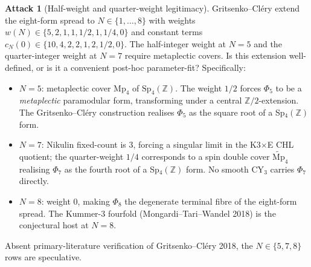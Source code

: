 \documentclass[11pt]{article}
\theoremstyle{definition}
\newtheorem{attack}[theorem]{Attack}
\begin{document}
\begin{attack}[Half-weight and quarter-weight legitimacy]
Gritsenko--Cl\'ery extend the eight-form spread to $N \in \{1, \ldots, 8\}$
with weights $w(N) \in \{5, 2, 1, 1, 1/2, 1, 1/4, 0\}$ and constant terms
$c_N(0) \in \{10, 4, 2, 2, 1, 2, 1/2, 0\}$. The half-integer weight at
$N = 5$ and the quarter-integer weight at $N = 7$ require metaplectic
covers. Is this extension well-defined, or is it a convenient
post-hoc parameter-fit? Specifically:
\begin{itemize}
\item $N = 5$: metaplectic cover $\mathrm{Mp}_4$ of $\mathrm{Sp}_4(\mathbb{Z})$.
The weight $1/2$ forces $\Phi_5$ to be a \emph{metaplectic} paramodular
form, transforming under a central $\mathbb{Z}/2$-extension. The
Gritsenko--Cl\'ery construction realises $\Phi_5$ as the square root
of a Sp$_4(\mathbb{Z})$ form.
\item $N = 7$: Nikulin fixed-count is $3$, forcing a singular limit in
the K3$\times$E CHL quotient; the quarter-weight $1/4$ corresponds to a
spin double cover $\widetilde{\mathrm{Mp}}_4$ realising $\Phi_7$ as the
fourth root of a Sp$_4(\mathbb{Z})$ form. No smooth CY$_3$ carries
$\Phi_7$ directly.
\item $N = 8$: weight $0$, making $\Phi_8$ the degenerate terminal fibre
of the eight-form spread. The Kummer-$3$ fourfold
(Mongardi--Tari--Wandel 2018) is the conjectural host at $N = 8$.
\end{itemize}
Absent primary-literature verification of Gritsenko--Cl\'ery 2018, the
$N \in \{5, 7, 8\}$ rows are speculative.
\end{attack}
\end{document}
